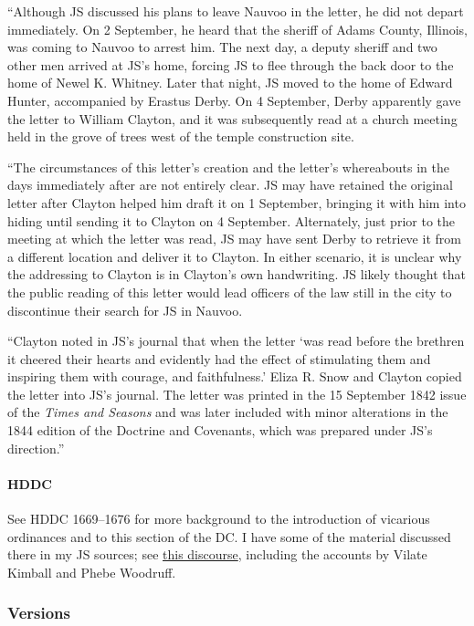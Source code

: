 			``Although JS discussed his plans to leave Nauvoo in the letter, he did not depart immediately. On 2 September, he heard that the sheriff of Adams County, Illinois, was coming to Nauvoo to arrest him. The next day, a deputy sheriff and two other men arrived at JS's home, forcing JS to flee through the back door to the home of Newel K. Whitney. Later that night, JS moved to the home of Edward Hunter, accompanied by Erastus Derby. On 4 September, Derby apparently gave the letter to William Clayton, and it was subsequently read at a church meeting held in the grove of trees west of the temple construction site. 

			``The circumstances of this letter's creation and the letter's whereabouts in the days immediately after are not entirely clear. JS may have retained the original letter after Clayton helped him draft it on 1 September, bringing it with him into hiding until sending it to Clayton on 4 September. Alternately, just prior to the meeting at which the letter was read, JS may have sent Derby to retrieve it from a different location and deliver it to Clayton. In either scenario, it is unclear why the addressing to Clayton is in Clayton's own handwriting. JS likely thought that the public reading of this letter would lead officers of the law still in the city to discontinue their search for JS in Nauvoo.

			``Clayton noted in JS's journal that when the letter `was read before the brethren it cheered their hearts and evidently had the effect of stimulating them and inspiring them with courage, and faithfulness.' Eliza R. Snow and Clayton copied the letter into JS's journal. The letter was printed in the 15 September 1842 issue of the \textit{Times and Seasons} and was later included with minor alterations in the 1844 edition of the Doctrine and Covenants, which was prepared under JS's direction.''
			
		\paragraph{HDDC}
		
			See HDDC 1669--1676 for more background to the introduction of vicarious ordinances and to this section of the DC. I have some of the material discussed there in my JS sources; see \hyperref[EMS-1840-JS-3-5-OCT-1840]{this discourse}, including the accounts by Vilate Kimball and Phebe Woodruff.
					
	\subsubsection{Versions}
		\label{DC127-V}
		
